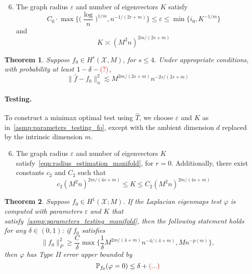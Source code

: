 \documentclass{article}
\newcommand{\1}{\mathbf{1}}
\newcommand{\mc}[1]{\mathcal{#1}}
\newcommand{\Pbb}{\mathbb{P}}
\newcommand{\wh}[1]{\widehat{#1}}
\theoremstyle{alden}
\theoremstyle{aldenthm}
\newtheorem{theorem}{Theorem}
\theoremstyle{definition}
\theoremstyle{remark}
\begin{document}
\begin{enumerate}[label=(A\arabic*)]
	\setcounter{enumi}{5}
	\item 
	\label{asmp:parameters_estimation_manifold}
	The graph radius $\varepsilon$ and number of eigenvectors $K$ satisfy
	\begin{equation}
	\label{eqn:radius_estimation_manifold}
	C_0 \cdot \max\biggl\{\biggl(\frac{\log}{n}\biggr)^{1/m}, n^{-1/(2r + m)}\biggr\} \leq \varepsilon \leq \min\{i_0, K^{-1/m}\}
	\end{equation}
	and
	\begin{equation*}
	K \asymp (M^2n)^{2m/(2s + m)}
	\end{equation*}
\end{enumerate}

\begin{theorem}
	\label{thm:laplacian_eigenmaps_estimation_manifold}
	Suppose $f_0 \in H^s(\mc{X},M)$, for $s \leq 4$. Under appropriate conditions, with probability at least $1 - \delta - \textcolor{red}{(?)}$,
	\begin{equation}
	\label{eqn:laplacian_eigenmaps_estimation_manifold}
	\|\wh{f} - f_0\|_n^2 \lesssim M^{2m/(2s + m)}n^{-2s/(2s + m)}
	\end{equation}
\end{theorem}

\paragraph{Testing.}
To construct a minimax optimal test using $\wh{T}$, we choose $\varepsilon$ and $K$ as in~\ref{asmp:parameters_testing_fo}, except with the ambient dimension $d$ replaced by the intrinsic dimension $m$.
\begin{enumerate}[label=(A\arabic*)]
	\setcounter{enumi}{5}
	\item 
	\label{asmp:parameters_testing_manifold}
	The graph radius $\varepsilon$ and number of eigenvectors $K$ satisfy~\eqref{eqn:radius_estimation_manifold}, for $r = 0$. Additionally, there exist constants $c_2$ and $C_2$ such that
	\begin{equation*}
	c_2 (M^2n)^{2m/(4s + m)} \leq K \leq C_2 (M^2n)^{2m/(4s + m)}
	\end{equation*}
\end{enumerate}

\begin{theorem}
	\label{thm:laplacian_eigenmaps_testing_manifold}
	Suppose $f_0 \in H^1(\mc{X};M)$. If the Laplacian eigenmaps test $\varphi$ is computed with parameters $\varepsilon$ and $K$ that satisfy~\ref{asmp:parameters_testing_manifold}, then the following statement holds for any $\delta \in (0,1)$: if $f_0$ satisfies
	\begin{equation}
	\label{eqn:laplacian_eigenmaps_testing_criticalradius_manifold}
	\|f_0\|_P^2 \geq \frac{C}{\delta} \max\biggl\{\frac{1}{\delta}M^{2m/(4 + m)}n^{-4/(4 + m)}, M n^{-p(m)}\biggr\},
	\end{equation}
	then $\varphi$ has Type II error upper bounded by 
	\begin{equation}
	\Pbb_{f_0}(\varphi = 0) \leq \delta + \textcolor{red}{(...)}
	\end{equation}
\end{theorem}
\end{document}
